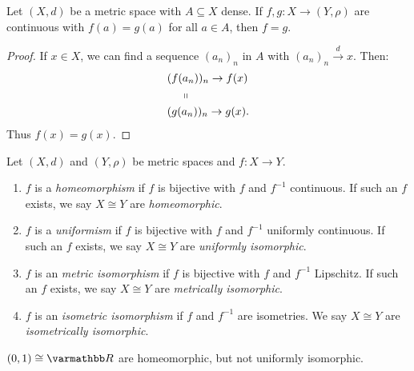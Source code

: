     \begin{proposition}
        Let $(X,d)$ be a metric space with $A \subseteq X$ dense. If $f,g :X \rightarrow (Y,\rho)$ are continuous with $f(a) = g(a)$ for all $a \in A$, then $f = g$.
    \end{proposition}
        \begin{proof}
            If $x \in X$, we can find a sequence $(a_n)_n$ in $A$ with $(a_n)_n \xrightarrow{d} x$. Then:
                \begin{equation*}
                \begin{split}
                    &(f(a_n))_n \rightarrow f(x) \\
                    & \h9\h3\shortparallel \\
                    & (g(a_n))_n \rightarrow g(x).
                \end{split}
                \end{equation*}
            Thus $f(x) = g(x)$.
        \end{proof}

    \begin{definition}
        Let $(X,d)$ and $(Y,\rho)$ be metric spaces and $f:X \rightarrow Y$.
        \begin{enumerate}[label = (\arabic*),itemsep=1pt,topsep=3pt]
            \item $f$ is a \textit{homeomorphism} if $f$ is bijective with $f$ and $f^{-1}$ continuous. If such an $f$ exists, we say $X \cong Y$ are \textit{homeomorphic}.
            \item $f$ is a \textit{uniformism} if $f$ is bijective with $f$ and $f^{-1}$ uniformly continuous. If such an $f$ exists, we say $X \cong Y$ are \textit{uniformly isomorphic}.
            \item $f$ is an \textit{metric isomorphism} if $f$ is bijective with $f$ and $f^{-1}$ Lipschitz. If such an $f$ exists, we say $X \cong Y$ are \textit{metrically isomorphic}.
            \item $f$ is an \textit{isometric isomorphism} if $f$ and $f^{-1}$ are isometries. We say $X \cong Y$ are \textit{isometrically isomorphic}.
        \end{enumerate}
    \end{definition}

    \begin{example}
        $(0,1) \cong \bfR$ are homeomorphic, but not uniformly isomorphic.
    \end{example}

